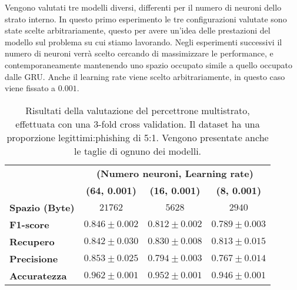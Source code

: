 \documentclass[../../main.tex]{subfiles}
\begin{document}
    Vengono valutati tre modelli diversi, differenti per il numero di neuroni dello strato interno. In questo primo esperimento le tre configurazioni valutate sono state scelte arbitrariamente, questo per avere un'idea delle prestazioni del modello sul problema su cui stiamo lavorando. Negli esperimenti successivi il numero di neuroni verrà scelto cercando di massimizzare le performance, e contemporaneamente mantenendo uno spazio occupato simile a quello occupato dalle GRU. Anche il learning rate viene scelto arbitrariamente, in questo caso viene fissato a $0.001$.

    \begin{table}[H]
        \centering
        \begin{tabular}{lccc}
            \toprule
            {} &                      \multicolumn{3}{c}{\textbf{(Numero neuroni, Learning rate)}}\\
            {} &                      \textbf{(64, 0.001)} & \textbf{(16, 0.001)} & \textbf{(8, 0.001)} \\
            \midrule
            \textbf{Spazio (Byte)}  &      $21762$ & $5628$ & $2940$\\
            \midrule
            \textbf{F1-score }      &      $0.846 \pm 0.002$ & $0.812 \pm 0.002$ & $0.789 \pm 0.003$\\
            \textbf{Recupero   }    &      $0.842 \pm 0.030$ & $0.830 \pm 0.008$ & $0.813 \pm 0.015$\\
            \textbf{Precisione}     &      $0.853 \pm 0.025$ & $0.794 \pm 0.003$ & $0.767 \pm 0.014$\\
            \textbf{Accuratezza}    &      $0.962 \pm 0.001$ & $0.952 \pm 0.001$ & $0.946 \pm 0.001$\\
            \bottomrule            
        \end{tabular}
        \caption{Risultati della valutazione del percettrone multistrato, effettuata con una 3-fold cross validation. Il dataset ha una proporzione legittimi:phishing di 5:1. Vengono presentate anche le taglie di ognuno dei modelli.}
        \label{tab:FFNNModelSelection}
    \end{table}
\end{document}
